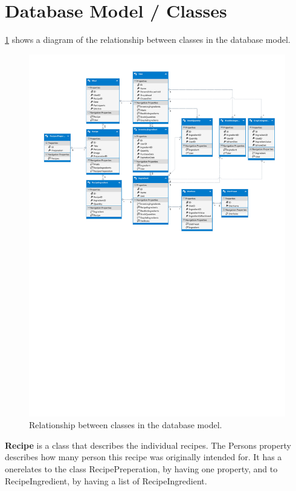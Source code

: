\section{Database Model / Classes} \label{DataBaseModel/Classes}
\cref{DatabaseModel} shows a diagram of the relationship between classes in the database model.

\begin{figure}[H]
	\centering
    \includegraphics[width=1\textwidth, trim=0 400 0 0]{Grafik/FoodDatabase.pdf}
	\caption{Relationship between classes in the database model.}
	\label{DatabaseModel}
\end{figure}

\textbf{Recipe} is a class that describes the individual recipes. The Persons property describes how many person this recipe was originally intended for. It has a onerelates to the class RecipePreperation, by having one property, and to RecipeIngredient, by having a list of RecipeIngredient. 

